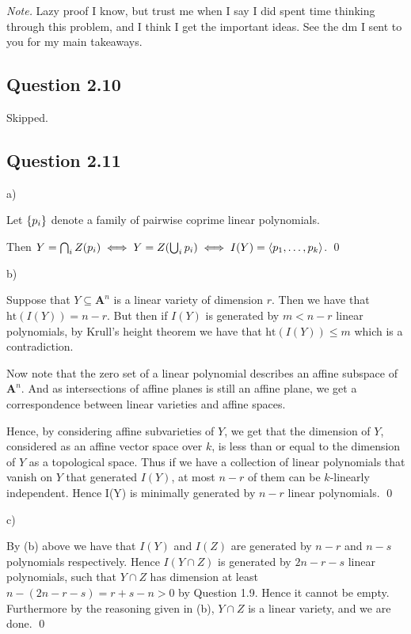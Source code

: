 \documentclass{article}
\begin{document}
\textit{Note.} Lazy proof I know, but trust me when I say I did spent time thinking through this problem, and I think I get the important ideas. See the dm I sent to you for my main takeaways.

\subsection*{Question 2.10}

Skipped.

\subsection*{Question 2.11}

\noindent a)

Let $\{p_i\}$ denote a family of pairwise coprime linear polynomials.

Then $Y = \bigcap_i Z(p_i) \iff Y = Z(\bigcup_i p_i) \iff I(Y) = \langle p_1, \dots, p_k\rangle$. \qed

\noindent b)

Suppose that $Y \subseteq \mathbf{A}^n$ is a linear variety of dimension $r$. Then we have that $\text{ht}(I(Y)) = n-r$. But then if $I(Y)$ is generated by $m < n-r$ linear polynomials, by Krull's height theorem we have that $\text{ht}(I(Y)) \leq m$ which is a contradiction.

Now note that the zero set of a linear polynomial describes an affine subspace of $\mathbf{A}^n$. And as intersections of affine planes is still an affine plane, we get a correspondence between linear varieties and affine spaces.

Hence, by considering affine subvarieties of $Y$, we get that the dimension of $Y$, considered as an affine vector space over $k$, is less than or equal to the dimension of $Y$ as a topological space. Thus if we have a collection of linear polynomials that vanish on $Y$ that generated $I(Y)$, at most $n-r$ of them can be $k$-linearly independent. Hence I(Y) is minimally generated by $n-r$ linear polynomials. \qed

\noindent c)

By (b) above we have that $I(Y)$ and $I(Z)$ are generated by $n-r$ and $n-s$ polynomials respectively. Hence $I(Y \cap Z)$ is generated by $2n-r-s$ linear polynomials, such that $Y\cap Z$ has dimension at least $n - (2n-r-s) = r+s-n > 0$ by Question 1.9. Hence it cannot be empty. Furthermore by the reasoning given in (b), $Y\cap Z$ is a linear variety, and we are done. \qed
\lspace
\end{document}
